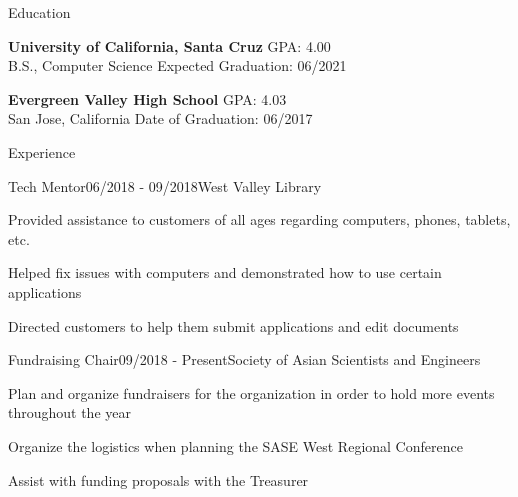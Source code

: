 \documentclass{resume}
\begin{document}
\begin{rSection}{Education}

{\bf University of California, Santa Cruz} \hfill {GPA: 4.00} 
\\ B.S., Computer Science \hfill {Expected Graduation: 06/2021}

\item {\bf Evergreen Valley High School} \hfill { GPA: 4.03} 
\\ San Jose, California \hfill {Date of Graduation: 06/2017}

\end{rSection}


\begin{rSection}{Experience}

\begin{rSubsection}{Tech Mentor}{06/2018 - 09/2018}{West Valley Library}{}
\item Provided assistance to customers of all ages regarding computers, phones, tablets, etc.
\item Helped fix issues with computers and demonstrated how to use certain applications
\item Directed customers to help them submit applications and edit documents
\end{rSubsection}

\begin{rSubsection}{Fundraising Chair}{09/2018 - Present}{Society of Asian Scientists and Engineers}{}
\item Plan and organize fundraisers for the organization in order to hold more events throughout the year
\item Organize the logistics when planning the SASE West Regional Conference
\item Assist with funding proposals with the Treasurer
\end{rSubsection}

\end{rSection}
\end{document}
